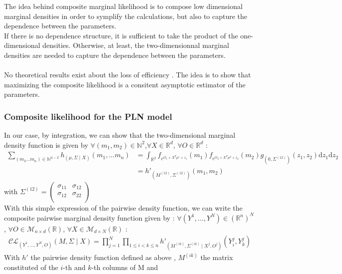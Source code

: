 \documentclass[11pt, a4paper]{article}
\begin{document}
The idea behind composite marginal likelihood \cite{varin2008composite} is to compose low dimensional marginal densities in order to symplify the calculations, but also to capture the dependence between the parameters. \\
If there is no dependence structure, it is sufficient to take the product of the one-dimensional densities. Otherwise, at least, the two-dimensionnal marginal densities are needed  to capture the  dependence between the parameters.\\
\\
No theoretical results exist about the loss of efficiency \cite{lele2006sampling}. The idea is to show that maximizing the composite likelihood is a consitent asymptotic estimator of the parameters.

\subsubsection{Composite likelihood for the PLN model}
In our case, by integration, we can show that the two-dimensional marginal density function is given by $ \forall (m_1,m_2) \in \mathbb{N}^2$,$\forall X \in \mathbb{R}^d$, $ \forall O \in \mathbb{R}^d$ :
\begin{align*}
 \sum_{(m_3...m_n) \in \mathbb{N}^{n-2}} h_{(\mu,\Sigma \mid X)}(m_1,...m_n) &= \int_{\mathbb{R}^2} f_{e^{O_1+X^T \mu^1+z_1}}(m_1) f_{e^{O_2+X^T \mu^2+z_2}}(m_2) g_{(0,\Sigma^{(12)})}(z_1,z_2)\mathrm{d}z_1 \mathrm{d}z_2\\
 &= h'_{(M^{(12)},\Sigma^{(12)})}(m_1,m_2)
\end{align*}
with $\Sigma^{(12)}=\begin{pmatrix}
\sigma_{11} & \sigma_{12} \\
\sigma_{12} & \sigma_{22}\\
\end{pmatrix}$\\
With this simple expression of the pairwise density function, we can write the composite pairwise marginal density function given by : $\forall (Y^1,...,Y^N) \in (\mathbb{R}^n)^N$, $\forall O \in \mathcal{M}_{n \times d} (\mathbb{R})$, $\forall X \in \mathcal{M}_{d \times N}(\mathbb{R})$ :
\begin{align}
\mathcal{CL}_{(Y^1,...,Y^N,O)}(M,\Sigma \mid X) = \prod_{j=1}^N \prod_{1 \leq i < k \leq n}  h'_{(M^{(ik)},\Sigma^{(ik)} \mid X^j,O^j)}(Y^j_i,Y^j_k)
\end{align}
With $h'$ the pairwise density function defined as above , $M^{(ik)}$ the matrix constituted of the $i$-th and $k$-th columns of M and 
\end{document}
